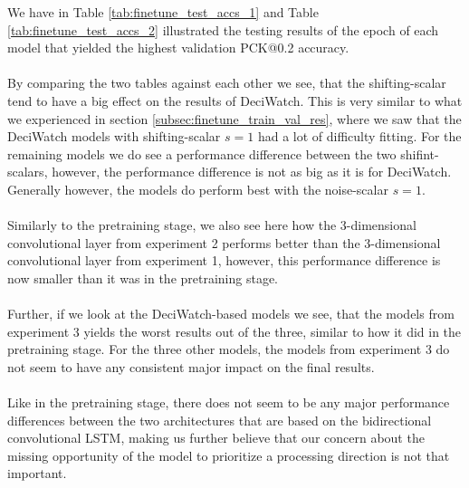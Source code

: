 \documentclass[./main.tex]{subfiles}
\begin{document}
\noindent We have in Table \ref{tab:finetune_test_accs_1} and Table \ref{tab:finetune_test_accs_2} illustrated the testing results of the epoch of each model that yielded the highest validation PCK@0.2 accuracy.
\\
\\
By comparing the two tables against each other we see, that the shifting-scalar tend to have a big effect on the results of DeciWatch. This is very similar to what we experienced in section \ref{subsec:finetune_train_val_res}, where we saw that the DeciWatch models with shifting-scalar $s = 1$ had a lot of difficulty fitting. For the remaining models we do see a performance difference between the two shifint-scalars, however, the performance difference is not as big as it is for DeciWatch. Generally however, the models do perform best with the noise-scalar $s = 1$.
\\
\\
Similarly to the pretraining stage, we also see here how the 3-dimensional convolutional layer from experiment 2 performs better than the 3-dimensional convolutional layer from experiment 1, however, this performance difference is now smaller than it was in the pretraining stage.
\\
\\
Further, if we look at the DeciWatch-based models we see, that the models from experiment 3 yields the worst results out of the three, similar to how it did in the pretraining stage. For the three other models, the models from experiment 3 do not seem to have any consistent major impact on the final results.
\\
\\
Like in the pretraining stage, there does not seem to be any major performance differences between the two architectures that are based on the bidirectional convolutional LSTM, making us further believe that our concern about the missing opportunity of the model to prioritize a processing direction is not that important.
\end{document}
